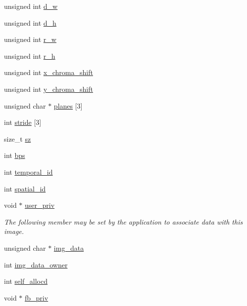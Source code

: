 \begin{DoxyCompactItemize}
unsigned int \hyperlink{structaom__image_a89f80b1f58d608b9d2080635f4359034}{d\+\_\+w}
\item 
unsigned int \hyperlink{structaom__image_ab986419a1f0fff93a2dc505f47194988}{d\+\_\+h}
\item 
unsigned int \hyperlink{structaom__image_aa2365dc74ee71cded1a149e5d48d6c86}{r\+\_\+w}
\item 
unsigned int \hyperlink{structaom__image_aa996793ca8bfb0e6da05945898d39367}{r\+\_\+h}
\item 
unsigned int \hyperlink{structaom__image_a83fdb3677275dc0e1e38701000447214}{x\+\_\+chroma\+\_\+shift}
\item 
unsigned int \hyperlink{structaom__image_a5acfc850c272e1377f3b7d58a95f3749}{y\+\_\+chroma\+\_\+shift}
\item 
unsigned char $\ast$ \hyperlink{structaom__image_ac54dbc5237ca2914f9ec30105dfbe302}{planes} \mbox{[}3\mbox{]}
\item 
int \hyperlink{structaom__image_a6dc693d7dbc9eb06c0cdde307ca58372}{stride} \mbox{[}3\mbox{]}
\item 
size\+\_\+t \hyperlink{structaom__image_af0f6c220bf000d1c488075c19d889290}{sz}
\item 
int \hyperlink{structaom__image_a8b3396eaa38cbc62a90bfccd00b93b5a}{bps}
\item 
int \hyperlink{structaom__image_a11c7cb24c961e9bdcf25977a5dc53a40}{temporal\+\_\+id}
\item 
int \hyperlink{structaom__image_a1c3a59a1de1895da27135d04218f961a}{spatial\+\_\+id}
\item 
\mbox{\label{structaom__image_a522583fa7c1cda5ede3f65e9e574cf9f}} 
void $\ast$ \hyperlink{structaom__image_a522583fa7c1cda5ede3f65e9e574cf9f}{user\+\_\+priv}
\begin{DoxyCompactList}\small\item\em The following member may be set by the application to associate data with this image. \end{DoxyCompactList}\item 
unsigned char $\ast$ \hyperlink{structaom__image_a7c367f3227d5876ce9e5c198a01c2028}{img\+\_\+data}
\item 
int \hyperlink{structaom__image_ad29ed1ce3206c77ade67a76b69ee339e}{img\+\_\+data\+\_\+owner}
\item 
int \hyperlink{structaom__image_adcb959372df75813c6b1e01903ec3011}{self\+\_\+allocd}
\item 
void $\ast$ \hyperlink{structaom__image_aab189cb8d141a7b46102a913327398b3}{fb\+\_\+priv}
\end{DoxyCompactItemize}


